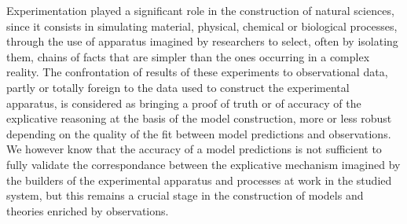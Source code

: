 \documentclass[10pt]{article}
\begin{document}
Experimentation played a significant role in the construction of natural sciences, since it consists in simulating material, physical, chemical or biological processes, through the use of apparatus imagined by researchers to select, often by isolating them, chains of facts that are simpler than the ones occurring in a complex reality. The confrontation of results of these experiments to observational data, partly or totally foreign to the data used to construct the experimental apparatus, is considered as bringing a proof of truth or of accuracy of the explicative reasoning at the basis of the model construction, more or less robust depending on the quality of the fit between model predictions and observations. We however know that the accuracy of a model predictions is not sufficient to fully validate the correspondance between the explicative mechanism imagined by the builders of the experimental apparatus and processes at work in the studied system, but this remains a crucial stage in the construction of models and theories enriched by observations.
\end{document}
